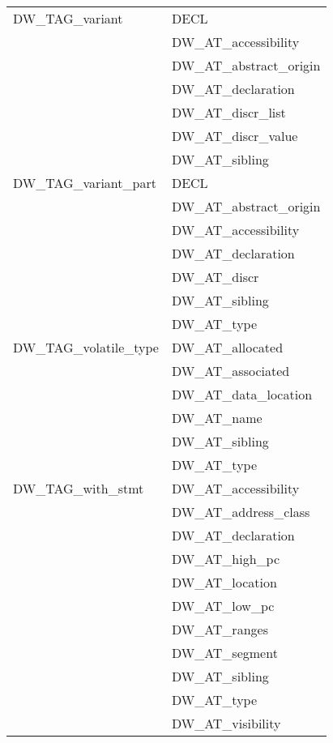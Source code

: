 \begin{longtable}{l|p{8cm}}
DW\_TAG\_variant
&DECL    \\
&DW\_AT\_accessibility   \\
&DW\_AT\_abstract\_origin   \\
&DW\_AT\_declaration   \\
&DW\_AT\_discr\_list   \\
&DW\_AT\_discr\_value   \\
&DW\_AT\_sibling   \\

DW\_TAG\_variant\_part
&DECL   \\
&DW\_AT\_abstract\_origin   \\
&DW\_AT\_accessibility   \\
&DW\_AT\_declaration   \\
&DW\_AT\_discr   \\
&DW\_AT\_sibling   \\
&DW\_AT\_type   \\

DW\_TAG\_volatile\_type  
&DW\_AT\_allocated   \\
&DW\_AT\_associated    \\
&DW\_AT\_data\_location    \\
&DW\_AT\_name    \\
&DW\_AT\_sibling    \\
&DW\_AT\_type    \\

DW\_TAG\_with\_stmt
&DW\_AT\_accessibility    \\
&DW\_AT\_address\_class    \\
&DW\_AT\_declaration    \\
&DW\_AT\_high\_pc    \\
&DW\_AT\_location    \\
&DW\_AT\_low\_pc    \\
&DW\_AT\_ranges    \\
&DW\_AT\_segment    \\
&DW\_AT\_sibling    \\
&DW\_AT\_type    \\
&DW\_AT\_visibility    \\
\end{longtable}
